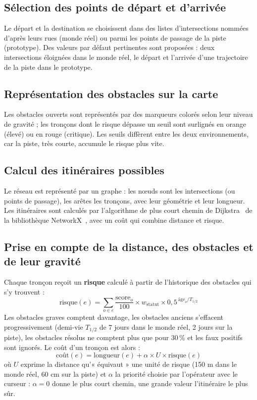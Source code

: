 
\subsection{Sélection des points de départ et d'arrivée}
Le départ et la destination se choisissent dans des listes d'intersections nommées d'après leurs rues (monde réel)
ou parmi les points de passage de la piste (prototype). Des valeurs par défaut pertinentes sont proposées : deux
intersections éloignées dans le monde réel, le départ et l'arrivée d'une trajectoire de la piste dans le prototype.

\subsection{Représentation des obstacles sur la carte}
Les obstacles ouverts sont représentés par des marqueurs colorés selon leur niveau de gravité ; les tronçons dont le
risque dépasse un seuil sont surlignés en orange (élevé) ou en rouge (critique). Les seuils diffèrent entre les deux
environnements, car la piste, très courte, accumule le risque plus vite.

\subsection{Calcul des itinéraires possibles}
Le réseau est représenté par un graphe : les nœuds sont les intersections (ou points de passage), les arêtes les
tronçons, avec leur géométrie et leur longueur. Les itinéraires sont calculés par l'algorithme de plus court chemin
de Dijkstra~\cite{dijkstra1959} de la bibliothèque NetworkX~\cite{networkx}, avec un coût qui combine distance et
risque.

\subsection{Prise en compte de la distance, des obstacles et de leur gravité}
Chaque tronçon reçoit un \textbf{risque} calculé à partir de l'historique des obstacles qui s'y trouvent :
\begin{equation}
  \text{risque}(e) = \sum_{o \in e} \frac{\text{score}_o}{100} \times w_{\text{statut}} \times
  0{,}5^{\,\text{âge}_o / T_{1/2}}
\end{equation}
Les obstacles graves comptent davantage, les obstacles anciens s'effacent progressivement (demi-vie $T_{1/2}$ de
7 jours dans le monde réel, 2 jours sur la piste), les obstacles résolus ne comptent plus que pour 30\,\% et les faux
positifs sont ignorés. Le coût d'un tronçon est alors :
\begin{equation}
  \text{coût}(e) = \text{longueur}(e) + \alpha \times U \times \text{risque}(e)
\end{equation}
où $U$ exprime la distance qu'« équivaut » une unité de risque (150 m dans le monde réel, 60 cm sur la piste) et
$\alpha$ la priorité choisie par l'opérateur avec le curseur : $\alpha = 0$ donne le plus court chemin, une grande
valeur l'itinéraire le plus sûr.

